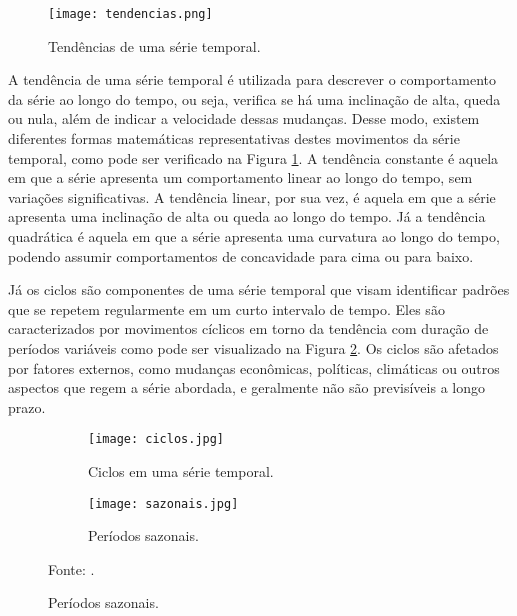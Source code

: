 \begin{figure}[htbp]
    \caption{Tendências de uma série temporal.}
      \centering
      \texttt{[image: tendencias.png]} 
    \label{fig:tendenciaSerie}
\end{figure}

A tendência de uma série temporal é utilizada para descrever o comportamento da série ao longo do tempo, ou seja, verifica se há uma inclinação de alta, queda ou nula, além de indicar a velocidade dessas mudanças. Desse modo, existem diferentes formas matemáticas representativas destes movimentos da série temporal, como pode ser verificado na Figura \ref{fig:tendenciaSerie}. A tendência constante é aquela em que a série apresenta um comportamento linear ao longo do tempo, sem variações significativas. A tendência linear, por sua vez, é aquela em que a série apresenta uma inclinação de alta ou queda ao longo do tempo. Já a tendência quadrática é aquela em que a série apresenta uma curvatura ao longo do tempo, podendo assumir comportamentos de concavidade para cima ou para baixo. 

Já os ciclos são componentes de uma série temporal que visam identificar padrões que se repetem regularmente em um curto intervalo de tempo. Eles são caracterizados por movimentos cíclicos em torno da tendência com duração de períodos variáveis como pode ser visualizado na Figura \ref{fig:ciclos}. Os ciclos são afetados por fatores externos, como mudanças econômicas, políticas, climáticas ou outros aspectos que regem a série abordada, e geralmente não são previsíveis a longo prazo.


\begin{figure}[htbp]
     \centering
     \caption{Características cíclicas e sazonais de uma série temporal.}
     \begin{subfigure}[b]{0.46\textwidth}
         \centering
         \texttt{[image: ciclos.jpg]}
         \caption{Ciclos em uma série temporal.}
         \label{fig:ciclos} 
     \end{subfigure}
     \hfill
     \begin{subfigure}[b]{0.495\textwidth}
         \centering
         \texttt{[image: sazonais.jpg]}
         \caption{Períodos sazonais.}
         \label{fig:sazonalidade}
     \end{subfigure}

     Fonte: .
\end{figure}

